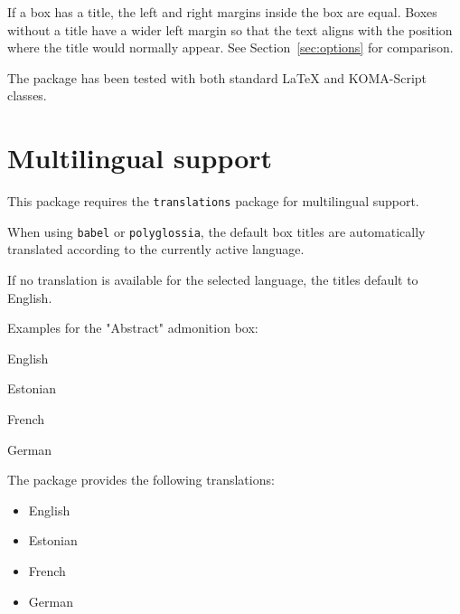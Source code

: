 \documentclass{scrartcl}
\begin{document}
If a box has a title, the left and right margins inside the box are equal.
Boxes without a title have a wider left margin so that the text aligns with
the position where the title would normally appear.
See Section~\ref{sec:options} for comparison.

\begin{AdmonitionSuccess}[]
The package has been tested with both standard \LaTeX{} and KOMA-Script
classes.
\end{AdmonitionSuccess}


\section{Multilingual support}

This package requires the \texttt{translations} package for multilingual
support.

When using \texttt{babel} or \texttt{polyglossia}, the default box titles are
automatically translated according to the currently active language.

If no translation is available for the selected language, the titles default
to English.

Examples for the "Abstract" admonition box:


\begin{AdmonitionAbstract}
English
\end{AdmonitionAbstract}


\begin{AdmonitionAbstract}
Estonian
\end{AdmonitionAbstract}


\begin{AdmonitionAbstract}
French
\end{AdmonitionAbstract}


\begin{AdmonitionAbstract}
German
\end{AdmonitionAbstract}


The package provides the following translations:

\begin{itemize}
  \item English
  \item Estonian
  \item French
  \item German
\end{itemize}
\end{document}
